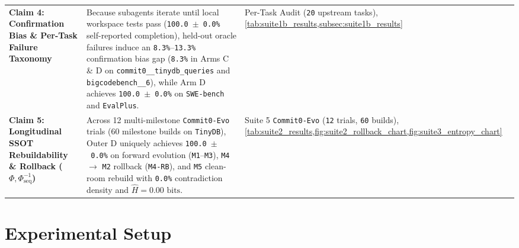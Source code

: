 \documentclass[11pt,a4paper,copyright]{google}
\begin{document}
\begin{table}[t!]
\begin{tabularx}{\textwidth}{L{3.1cm} Y L{2.8cm}}
\addlinespace[3pt]
\textbf{Claim 4: Confirmation Bias \& Per-Task Failure Taxonomy} & Because subagents iterate until local workspace tests pass (\texttt{100.0~$\pm$~0.0\%} self-reported completion), held-out oracle failures induce an \texttt{8.3\%}--\texttt{13.3\%} confirmation bias gap (\texttt{8.3\%} in Arms C \& D on \texttt{commit0\_\_tinydb\_queries} and \texttt{bigcodebench\_\_6}), while Arm D achieves \texttt{100.0~$\pm$~0.0\%} on \texttt{SWE-bench} and \texttt{EvalPlus}. & Per-Task Audit (\texttt{20} upstream tasks), \cref{tab:suite1b_results,subsec:suite1b_results} \\
\addlinespace[3pt]
\textbf{Claim 5: Longitudinal SSOT Rebuildability \& Rollback ($\Phi, \Phi_{\text{seq}}^{-1}$)} & Across 12 multi-milestone \texttt{Commit0-Evo} trials (60 milestone builds on \texttt{TinyDB}), Outer D uniquely achieves \texttt{100.0~$\pm$~0.0\%} on forward evolution (\texttt{M1}--\texttt{M3}), \texttt{M4} $\to$ \texttt{M2} rollback (\texttt{M4-RB}), and \texttt{M5} clean-room rebuild with \texttt{0.0\%} contradiction density and $\hat{H} = 0.00\text{ bits}$. & Suite 5 \texttt{Commit0-Evo} (\texttt{12} trials, \texttt{60} builds), \cref{tab:suite2_results,fig:suite2_rollback_chart,fig:suite3_entropy_chart} \\
\bottomrule
\end{tabularx}
\end{table}

\section{Experimental Setup}
\label{sec:setup}
\end{document}
